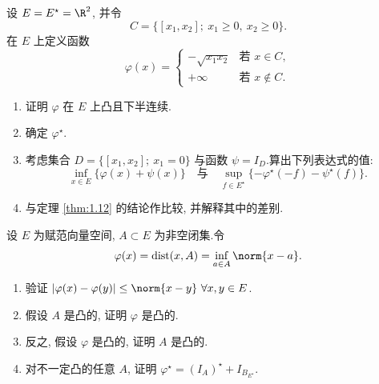 \begin{exercise}
\label{exer:1.21}
设 $E=E^\star=\R^2$, 并令
\begin{equation*}
C=\{[x_1,x_2];\ x_1\ge0,\ x_2\ge0\}.
\end{equation*}
在 $E$ 上定义函数
\begin{equation*}
\varphi(x)=\begin{cases}-\sqrt{x_1x_2} & \text{若 } x\in C,\\ +\infty & \text{若 } x\notin C.\end{cases}
\end{equation*}

\begin{enumerate}[label=\arabic*., leftmargin=2.2em, itemsep=0.25em]
	\item 证明 $\varphi$ 在 $E$ 上凸且下半连续.
	\item 确定 $\varphi^\star$.
	\item 考虑集合 $D=\{[x_1,x_2];\ x_1=0\}$ 与函数 $\psi=I_D$.算出下列表达式的值:
	      \begin{equation*}
	      \inf_{x\in E}\{\varphi(x)+\psi(x)\}
	      \quad\text{与}\quad
	      \sup_{f\in E^\star}\{-\varphi^\star(-f)-\psi^\star(f)\}.
	      \end{equation*}
	\item 与定理  \ref{thm:1.12} 的结论作比较, 并解释其中的差别.
\end{enumerate}
\end{exercise}

\begin{exercise}
\label{exer:1.22}
设 $E$ 为赋范向量空间, $A\subset E$ 为非空闭集.令
\begin{equation*}
\varphi(x)=\dist(x,A)=\inf_{a\in A}\norm{x-a}.
\end{equation*}

\begin{enumerate}[label=\arabic*., leftmargin=2.2em, itemsep=0.25em]
	\item 验证 $\abs{\varphi(x)-\varphi(y)}\le\norm{x-y}\ \forall x,y\in E$.
	\item 假设 $A$ 是凸的, 证明 $\varphi$ 是凸的.
	\item 反之, 假设 $\varphi$ 是凸的, 证明 $A$ 是凸的.
	\item 对不一定凸的任意 $A$, 证明 $\varphi^\star=(I_A)^\star+I_{B_{E^\star}}$.
\end{enumerate}
\end{exercise}

